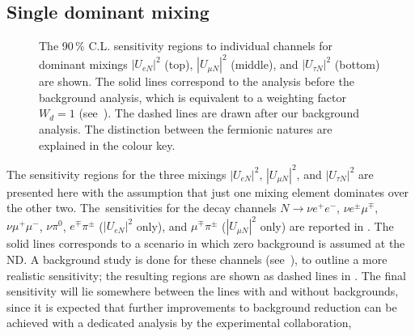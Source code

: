 \subsection{Single dominant mixing}
\label{sec:dominant}

\begin{figure}
	\centering
	{\resizebox{\linewidth}{!}{}}
	\vspace{0.05em}

	{\resizebox{\linewidth}{!}{}}
	\vspace{0.05em}

	{\resizebox{\linewidth}{!}{}}

	\caption{The 90\,\% C.L. sensitivity regions to individual channels for dominant mixings %
		$|U_{e N}|^2$ (top), $|U_{\mu N}|^2$ (middle), and $|U_{\tau N}|^2$ (bottom) are shown.
		The solid lines correspond to the analysis before the background analysis, which is equivalent %
		to a weighting factor $W_d = 1$ (see~).
		The dashed lines are drawn after our background analysis.
		The distinction between the fermionic natures are explained in the colour key.}
	\label{fig:senseW}
\end{figure}

The sensitivity regions for the three mixings $|U_{e N}|^2$, $|U_{\mu N}|^2$, and %
$|U_{\tau N}|^2$ are presented here with the assumption that just one mixing element dominates over the other two.
The~sensitivities for the decay channels $N\to\nu e^+ e^-$, $\nu e^\pm \mu^\mp$, $\nu \mu^+ \mu^-$, $\nu \pi^0$, %
$e^\mp \pi^\pm$ ($|U_{e N}|^2$ only), and $\mu^\mp \pi^\pm$ ($|U_{\mu N}|^2$ only) are reported in .
The solid lines corresponds to a scenario in which zero background is assumed at the ND.
A background study is done for these channels (see~), to outline a more realistic sensitivity; %
the resulting regions are shown as dashed lines in .
The final sensitivity will lie somewhere between the lines with and without backgrounds,
since it is expected that further improvements to background reduction can be achieved %
with a dedicated analysis by the experimental collaboration, %

